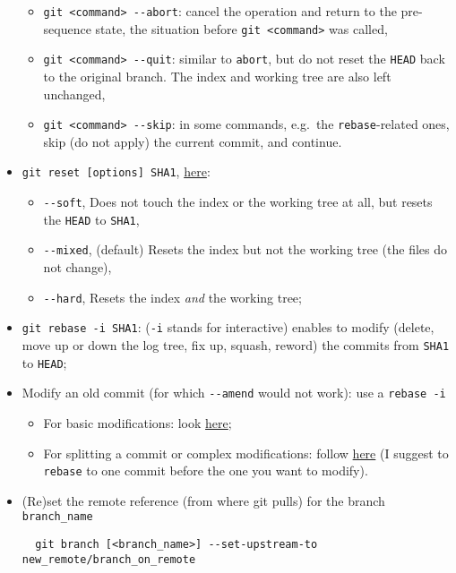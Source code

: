 \documentclass[a4paper,12pt,%
              final%
              ]{article}
\begin{document}
\begin{itemize}
\begin{itemize}
      \item \verb|git <command> --abort|: cancel the operation and return to the pre-sequence state, the situation before \texttt{git <command>} was called,
      \item \verb|git <command> --quit|: similar to \texttt{abort}, but do not reset the \texttt{HEAD} back to the original branch. The index and working tree are also left unchanged,
      \item \verb|git <command> --skip|: in some commands, e.g.~the \texttt{rebase}-related ones, skip (do not apply) the current commit, and continue.
    \end{itemize}
  \item \verb|git reset [options] SHA1|, \href{https://git-scm.com/docs/git-reset}{here}:
    \begin{itemize}
      \item \verb|--soft|, Does not touch the index or the working tree at all, but resets the \texttt{HEAD} to \texttt{SHA1},
      \item \verb|--mixed|, (default) Resets the index but not the working tree (the files do not change),
      \item \verb|--hard|, Resets the index \emph{and} the working tree;
    \end{itemize}
  \item \verb|git rebase -i SHA1|: (\texttt{-i} stands for interactive) enables to modify (delete, move up or down the log tree, fix up, squash, reword) the commits from \texttt{SHA1} to \texttt{HEAD};
  \item Modify an old commit (for which \verb|--amend| would not work): use a \texttt{rebase -i}
    \begin{itemize}
      \item For basic modifications: look \href{https://stackoverflow.com/questions/1186535/how-to-modify-a-specified-commit}{here};
      \item For splitting a commit or complex modifications: follow \href{https://stackoverflow.com/questions/6217156/break-a-previous-commit-into-multiple-commits}{here} (I suggest to \texttt{rebase} to one commit before the one you want to modify).
    \end{itemize}
  \item (Re)set the remote reference (from where git pulls) for the branch \verb|branch_name|
\begin{verbatim}
  git branch [<branch_name>] --set-upstream-to new_remote/branch_on_remote
\end{verbatim}

\end{itemize}
\end{document}
